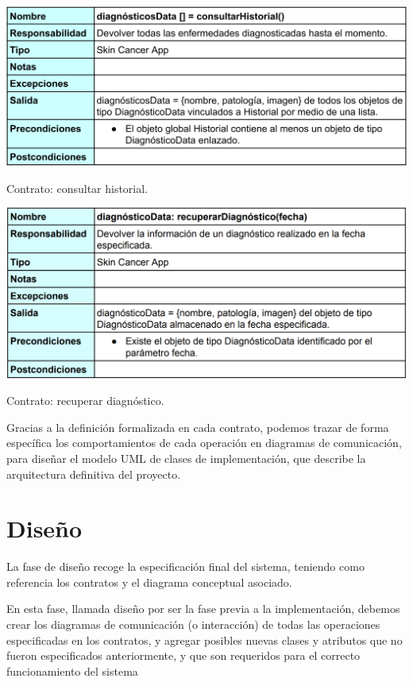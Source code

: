    \begin{table}[H]
 	\centering
 	\includegraphics[scale = 0.16]{imagenes/contrato5.png}
 	\caption{Contrato: consultar historial.}
 	\label{fig:contrato5}
 \end{table}
 
    \begin{table}[H]
 	\centering
 	\includegraphics[scale = 0.315]{imagenes/contrato6.png}
 	\caption{Contrato: recuperar diagnóstico.}
 	\label{fig:contrato6}
 \end{table}
 
 Gracias a la definición formalizada en cada contrato, podemos trazar de forma específica los comportamientos de cada operación en diagramas de comunicación, para diseñar el modelo UML de clases de implementación, que describe la arquitectura definitiva del proyecto.
 
 \section{Diseño}
 
 La fase de diseño recoge la especificación final del sistema, teniendo como referencia los contratos y el diagrama conceptual asociado.
 
 En esta fase, llamada diseño por ser la fase previa a la implementación,  debemos crear los diagramas de comunicación (o interacción) de todas las
 operaciones especificadas en los contratos, y agregar posibles nuevas clases y atributos que no fueron especificados anteriormente, y que son requeridos para el correcto funcionamiento del sistema
 
